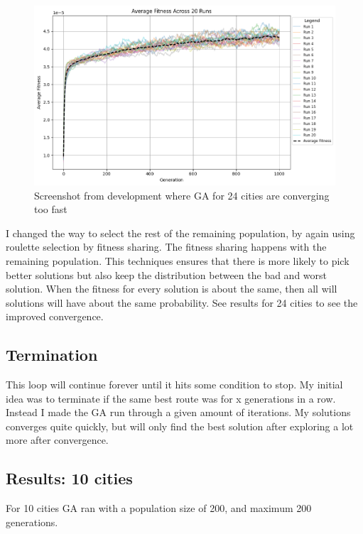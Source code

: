 \documentclass{article}
\begin{document}
    \begin{figure}[ht!]
        \includegraphics[width=12cm]{images/with_bad_inital_population.png}
        \centering
        \caption{Screenshot from development where GA for 24 cities are converging too fast}
    \end{figure}


    I changed the way to select the rest of the remaining population, by again using roulette selection by fitness sharing. The fitness sharing happens with the remaining population. 
    This techniques ensures that there is more likely to pick better solutions but also keep the distribution between the bad and worst solution. 
    When the fitness for every solution is about the same, then all will solutions will have about the same probability. See results for 24 cities to see the improved convergence.

    \subsection{Termination}

    This loop will continue forever until it hits some condition to stop. My initial idea was to terminate if the same best route was for x generations in a row.
    Instead I made the GA run through a given amount of iterations. My solutions converges quite quickly, but will only find the best solution after exploring a lot more after convergence. 

    \newpage

    \subsection{Results: 10 cities}

    For 10 cities GA ran with a population size of 200, and maximum 200 generations.
\end{document}
